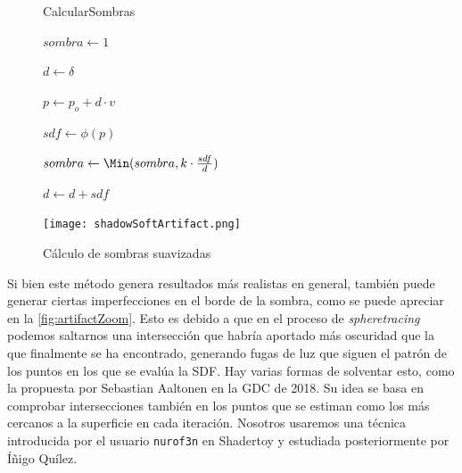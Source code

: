 \begin{figure}[ht!]
    \centering
    \begin{minipage}{0.50\textwidth}
       \begin{algorithm}[H]
            \caption{CalcularSombras}
                $sombra \gets 1$
                
                $d \gets \delta$ 
                
                 {
                    $p \gets p_o + d \cdot v$
                    
                    $sdf \gets \phi(p)$
                    
                    $sombra \gets \Min(sombra, k\cdot \frac{sdf}{d})$
                    
                    $d \gets d + sdf$

                }

        \end{algorithm}
    \end{minipage}%
    \hfill
    \begin{minipage}{0.48\textwidth}
        \texttt{[image: shadowSoftArtifact.png]}
    \end{minipage}
    \caption{Cálculo de sombras suavizadas}
    \label{fig:sombras2}
\end{figure}

Si bien este método genera resultados más realistas en general, también puede generar ciertas imperfecciones en el borde de la sombra, como se puede apreciar en la \autoref{fig:artifactZoom}. Esto es debido a que en el proceso de \textit{spheretracing} podemos saltarnos una intersección que habría aportado más oscuridad que la que finalmente se ha encontrado, generando fugas de luz que siguen el patrón de los puntos en los que se evalúa la SDF. Hay varias formas de solventar esto, como la propuesta por Sebastian Aaltonen \cite{gdc} en la GDC de 2018. Su idea se basa en comprobar intersecciones también en los puntos que se estiman como los más cercanos a la superficie en cada iteración. Nosotros usaremos una técnica introducida por el usuario \texttt{nurof3n} \cite{shadertoy-sombras} en Shadertoy y estudiada posteriormente por Íñigo Quílez.\newline

